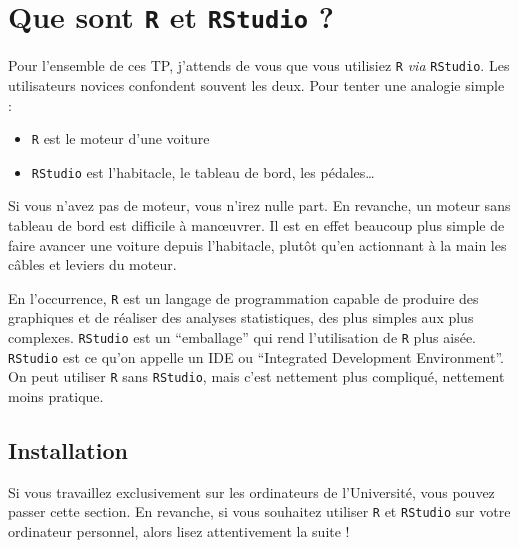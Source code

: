 \documentclass[
  letterpaper,
  DIV=11,
  numbers=noendperiod]{scrreprt}
\providecommand{\tightlist}{%
  \setlength{\itemsep}{0pt}\setlength{\parskip}{0pt}}\usepackage{longtable,booktabs,array}
\begin{document}
\hypertarget{que-sont-r-et-rstudio}{%
\section{\texorpdfstring{Que sont \texttt{R} et \texttt{RStudio}
?}{Que sont R et RStudio ?}}\label{que-sont-r-et-rstudio}}

Pour l'ensemble de ces TP, j'attends de vous que vous utilisiez
\texttt{R} \emph{via} \texttt{RStudio}. Les utilisateurs novices
confondent souvent les deux. Pour tenter une analogie simple :

\begin{itemize}
\tightlist
\item
  \texttt{R} est le moteur d'une voiture
\item
  \texttt{RStudio} est l'habitacle, le tableau de bord, les
  pédales\ldots{}
\end{itemize}

Si vous n'avez pas de moteur, vous n'irez nulle part. En revanche, un
moteur sans tableau de bord est difficile à manœuvrer. Il est en effet
beaucoup plus simple de faire avancer une voiture depuis l'habitacle,
plutôt qu'en actionnant à la main les câbles et leviers du moteur.

En l'occurrence, \texttt{R} est un langage de programmation capable de
produire des graphiques et de réaliser des analyses statistiques, des
plus simples aux plus complexes. \texttt{RStudio} est un ``emballage''
qui rend l'utilisation de \texttt{R} plus aisée. \texttt{RStudio} est ce
qu'on appelle un IDE ou ``Integrated Development Environment''. On peut
utiliser \texttt{R} sans \texttt{RStudio}, mais c'est nettement plus
compliqué, nettement moins pratique.

\hypertarget{sec-install}{%
\subsection{Installation}\label{sec-install}}

\begin{tcolorbox}[enhanced jigsaw, bottomtitle=1mm, title=\textcolor{quarto-callout-warning-color}{\faExclamationTriangle}\hspace{0.5em}{Avertissement}, breakable, opacitybacktitle=0.6, coltitle=black, opacityback=0, toprule=.15mm, toptitle=1mm, titlerule=0mm, colback=white, rightrule=.15mm, arc=.35mm, leftrule=.75mm, bottomrule=.15mm, left=2mm, colframe=quarto-callout-warning-color-frame, colbacktitle=quarto-callout-warning-color!10!white]
Si vous travaillez exclusivement sur les ordinateurs de l'Université,
vous pouvez passer cette section. En revanche, si vous souhaitez
utiliser \texttt{R} et \texttt{RStudio} sur votre ordinateur personnel,
alors lisez attentivement la suite !
\end{tcolorbox}
\end{document}
